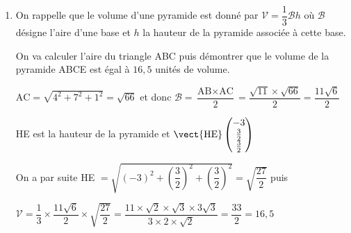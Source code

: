 \begin{enumerate}
\begin{enumerate}
		\item On démontre que le projeté orthogonal H  du point E sur le plan (ABC) a pour coordonnées $\left(4~;~\dfrac{1}{2}~;~\dfrac{5}{2}\right)$.
		
		H correspond à l'intersection du plan (ABC) avec la droite perpendiculaire à (ABC) qui passe par E soit la droite $\mathcal{D}$, les coordonnées de H seront donc solutions du système suivant  :
		
\begin{align*}
\begin{cases} x=1+2t\\y=2-t\\z=4-t\\2x-y-z-5=0\end{cases}& \iff\begin{cases} x=1+2t\\y=2-t\\z=4-t\\2(1+2t)-(2-t)-(4-t)-5=0\end{cases} \\
&\iff \begin{cases} x=1+2t\\y=2-t\\z=4-t\\6t-9=0\end{cases} 
&\iff \begin{cases} t=\frac{3}{2}\\x=4\\y = \frac{1}{2}\\z=\frac{5}{2}\end{cases}
\end{align*}
	\end{enumerate}
\item On rappelle que le volume d'une pyramide est donné par $\mathcal{V} = \dfrac13 \mathcal{B}h$ où $\mathcal{B}$ désigne l'aire d'une base et $h$  la hauteur de la pyramide associée à cette base.

On va calculer l'aire du triangle ABC puis démontrer que le volume de la pyramide  ABCE est égal à $16,5$ unités de volume.

$\text{AC}=\sqrt{4^2+7^2+1^2}=\sqrt{66}$ et donc $\mathscr{B}=\dfrac{\text{AB}\times \text{AC}}{2} = \dfrac{\sqrt{11}\times \sqrt{66}}{2}=\dfrac{11\sqrt{6}}{2}$

HE est la hauteur de la pyramide et $\vect{\text{HE}}\begin{pmatrix}-3\\\frac{3}{2}\\\frac{3}{2} \end{pmatrix}$

On a par suite HE $=\sqrt{(-3)^2+\left(\dfrac{3}{2}\right)^2+\left(\dfrac{3}{2}\right)^2}=\sqrt{\dfrac{27}{2}}$ puis

$ \mathscr{V}=\dfrac{1}{3}\times \dfrac{11\sqrt{6}}{2}\times \sqrt{\dfrac{27}{2}} 
=\dfrac{11\times \sqrt{2}\times \sqrt{3}\times 3\sqrt{3}}{3\times 2 \times \sqrt{2}}
=\dfrac{33}{2}
= 16,5$ 
\end{enumerate}
